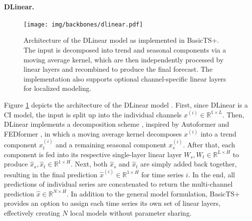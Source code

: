 \documentclass[a4paper,oneside,bibliography=totoc]{scrbook}
\begin{document}
\paragraph{DLinear.}
\begin{figure}
\centering
\texttt{[image: img/backbones/dlinear.pdf]}
\caption{Architecture of the DLinear model as implemented in BasicTS+. The input is decomposed into trend and seasonal components via a moving average kernel, which are then independently processed by linear layers and recombined to produce the final forecast. The implementation also supports optional channel-specific linear layers for localized modeling.}
\label{fig:DLinear}
\end{figure}
Figure \ref{fig:DLinear} depicts the architecture of the DLinear model \cite{zeng_are_2023}.
First, since DLinear is a CI model, the input is split up into the individual channels $x^{(i)} \in \mathbb{R}^{1 \times L}$. 
Then, DLinear implements a decomposition scheme \cite{cleveland_stl_1990}, inspired by Autoformer \cite{wu_autoformer_2021} and FEDformer \cite{zhou_fedformer_2022}, in which a moving average kernel decomposes $x^{(i)}$ into a trend component $x_t^{(i)}$ and a remaining seasonal component $x_s^{(i)}$.
After that, each component is fed into its respective single-layer linear layer $W_s, W_t \in \mathbb{R}^{L\times H}$ to produce $\hat{x}_s, \hat{x}_t \in \mathbb{R}^{1\times H}$. 
Next, both $\hat{x}_s$ and  $\hat{x}_t$ are simply added back together, resulting in the final prediction $\hat{x}^{(i)} \in \mathbb{R}^{1\times H}$ for time series $i$.
In the end, all predictions of individual series are concatenated to return the multi-channel prediction $\hat{x} \in \mathbb{R}^{N\times H}$.
In addition to the general model formulation, BasicTS+ provides an option to assign each time series its own set of linear layers, effectively creating $N$ local models without parameter sharing.
\end{document}
